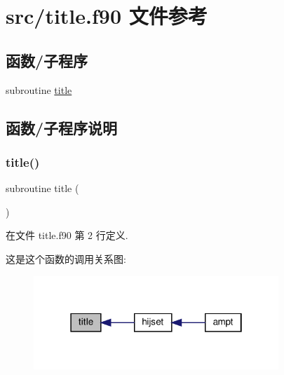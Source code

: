 \hypertarget{title_8f90}{}\section{src/title.f90 文件参考}
\label{title_8f90}
\subsection*{函数/子程序}
\begin{DoxyCompactItemize}
\item 
subroutine \mbox{\hyperlink{title_8f90_aa5c036d373cd37c00f0892e713b39988}{title}}
\end{DoxyCompactItemize}


\subsection{函数/子程序说明}
\mbox{\label{title_8f90_aa5c036d373cd37c00f0892e713b39988}} 
\subsubsection{\texorpdfstring{title()}{title()}}
{\footnotesize\ttfamily subroutine title (\begin{DoxyParamCaption}{ }\end{DoxyParamCaption})}



在文件 title.\+f90 第 2 行定义.

这是这个函数的调用关系图\+:
\nopagebreak
\begin{figure}[H]
\begin{center}
\leavevmode
\includegraphics[width=262pt]{title_8f90_aa5c036d373cd37c00f0892e713b39988_icgraph}
\end{center}
\end{figure}
